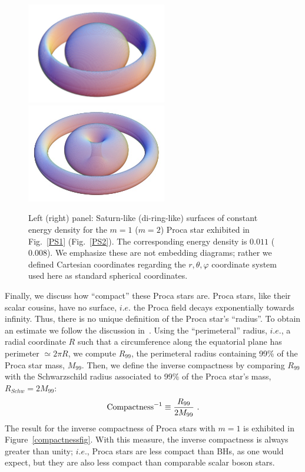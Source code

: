 \begin{figure}[h!]
  \begin{center}
    \includegraphics[width=6.1cm]{papers/Proca/3DPS1-m=1-v2.pdf} \qquad \qquad 
    \includegraphics[width=6.1cm]{papers/Proca/3DPS1-m=2-v2.pdf}   
         \end{center}
 \caption{Left (right) panel: Saturn-like (di-ring-like) surfaces of constant energy density for the $m=1$ ($m=2$) Proca star exhibited in Fig.~\ref{PS1} (Fig.~\ref{PS2}). The corresponding energy density is $0.011$ ($0.008$). We emphasize these are not embedding diagrams; rather we defined Cartesian coordinates regarding the $r,\theta,\varphi$ coordinate system used here as standard spherical coordinates.}
  \label{3D}
\end{figure}

Finally, we discuss how ``compact'' these Proca stars are.
Proca stars, like their scalar cousins, have no surface, $i.e.$ the Proca field decays exponentially towards infinity.
Thus, there is no unique definition of the Proca star's ``radius''.
To obtain an estimate we follow the discussion in~\cite{AmaroSeoane:2010qx,Herdeiro:2015gia}.
Using the ``perimeteral'' radius, $i.e.$, a radial coordinate $R$ such that a circumference along the equatorial plane has perimeter $\simeq 2\pi R$,  we compute $R_{99}$, the perimeteral radius containing 99\% of the Proca star mass, $M_{99}$. Then, we define the inverse compactness by comparing $R_{99}$ with the Schwarzschild radius associated to 99\% of the Proca star's mass, $R_{Schw}=2M_{99}$:
%
\begin{equation}
{\rm Compactness}^{-1}\equiv  \frac{R_{99}}{2M_{99}} \ .
\label{compactness}
\end{equation}
%
The result for the inverse compactness of Proca stars with $m=1$ is exhibited in Figure~\ref{compactnessfig}.
With this measure, the inverse compactness is always greater than unity; $i.e.$, Proca stars are less compact than BHs, as one would expect, but they are also less compact than comparable scalar boson stars.

